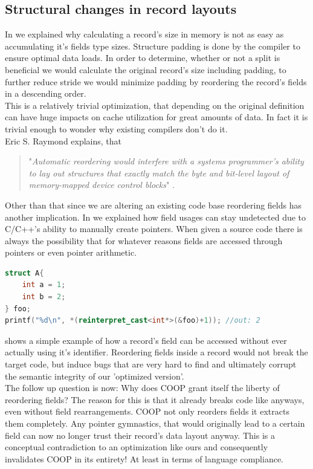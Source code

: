 \subsection{Structural changes in record layouts}\label{scirl}
In  we explained why calculating a record's size in memory is not as easy as accumulating it's fields type sizes. Structure padding is done by the compiler to ensure optimal data loads. In order to determine, whether or not a split is beneficial we would calculate the original record's size including padding, to further reduce stride we would minimize padding by reordering the record's fields in a descending order.\\
This is a relatively trivial optimization, that depending on the original definition can have huge impacts on cache utilization for great amounts of data. In fact it is trivial enough to wonder why existing compilers don't do it.\\
Eric S. Raymond explains, that
\begin{quote}
	"\textit{Automatic reordering would interfere with a systems programmer’s ability to lay out structures that exactly match the byte and bit-level layout of memory-mapped device control blocks}" .
\end{quote}
Other than that since we are altering an existing code base reordering fields has another implication. In  we explained how field usages can stay undetected due to C/C++'s ability to manually create pointers. When given a source code there is always the possibility that for whatever reasons fields are accessed through pointers or even pointer arithmetic.
\begin{lstlisting}[language=C++, name={Simple example of why automated field rearrangements can't be considered legal.}, label={pointer_arithmetic_access}]
struct A{
	int a = 1;
	int b = 2;
} foo;
printf("%d\n", *(reinterpret_cast<int*>(&foo)+1)); //out: 2
\end{lstlisting}
 shows a simple example of how a record's field can be accessed without ever actually using it's identifier. Reordering fields inside a record would not break the target code, but induce bugs that are very hard to find and ultimately corrupt the semantic integrity of our 'optimized version'.\\
The follow up question is now: Why does COOP grant itself the liberty of reordering fields? The reason for this is that it already breaks code like  anyways, even without field rearrangements. COOP not only reorders fields it extracts them completely. Any pointer gymnastics, that would originally lead to a certain field can now no longer trust their record's data layout anyway. This is a conceptual contradiction to an optimization like ours and consequently invalidates COOP in its entirety! At least in terms of language compliance.\\\\
